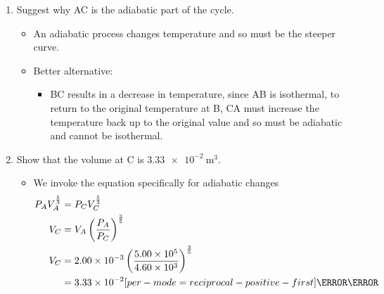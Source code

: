 \documentclass[a4paper,12pt]{article}
\let\oldsi\si
\renewcommand{\si}[1]{\oldsi[per-mode=reciprocal-positive-first]{#1}}
\begin{document}
\begin{enumerate}[label=(\alph*)]
  \item Suggest why AC is the adiabatic part of the cycle.
        \begin{itemize}
          \item An adiabatic process changes temperature and so must be the steeper curve.
          \item Better alternative:
                \begin{itemize}
                  \item BC results in a decrease in temperature, since AB is isothermal, to return to the original temperature at B, CA must increase the temperature back up to the original value and so must be adiabatic and cannot be isothermal.
                \end{itemize}
        \end{itemize}
  \item Show that the volume at C is $\SI{3.33e-2}{\metre\cubed}$.
        \begin{itemize}
          \item We invoke the equation specifically for adiabatic changes
                \begin{align*}
                  P_AV_A^{\frac{5}{3}} & = P_CV_C^{\frac{5}{3}}                                                                    \\
                  V_C                  & = V_A\left(\frac{P_A}{P_C}\right)^{\frac{3}{5}}                                           \\
                  V_C                  & = 2.00 \times 10^{-3}\left(\frac{5.00 \times 10^5}{4.60 \times 10^3}\right)^{\frac{3}{5}} \\
                                       & = 3.33 \times 10^{-2} \si{\metre\cubed}
                \end{align*}


\end{itemize}
\end{enumerate}
\end{document}
